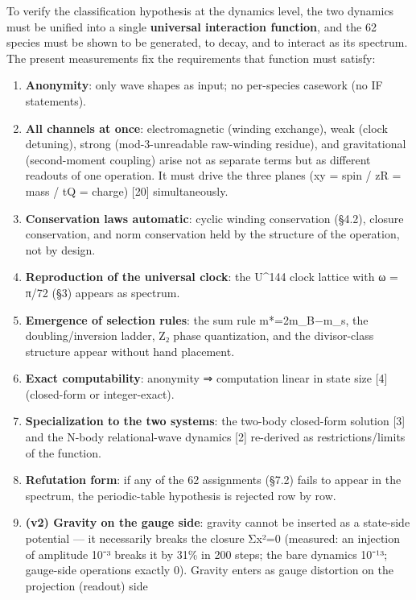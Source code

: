 \documentclass[
]{article}
\providecommand{\tightlist}{%
  \setlength{\itemsep}{0pt}\setlength{\parskip}{0pt}}
\begin{document}
To verify the classification hypothesis at the dynamics level, the two
dynamics must be unified into a single \textbf{universal interaction
function}, and the 62 species must be shown to be generated, to decay,
and to interact as its spectrum. The present measurements fix the
requirements that function must satisfy:

\begin{enumerate}
\def\labelenumi{\arabic{enumi}.}
\tightlist
\item
  \textbf{Anonymity}: only wave shapes as input; no per-species casework
  (no IF statements).
\item
  \textbf{All channels at once}: electromagnetic (winding exchange),
  weak (clock detuning), strong (mod-3-unreadable raw-winding residue),
  and gravitational (second-moment coupling) arise not as separate terms
  but as different readouts of one operation. It must drive the three
  planes (xy = spin / zR = mass / tQ = charge) {[}20{]} simultaneously.
\item
  \textbf{Conservation laws automatic}: cyclic winding conservation
  (§4.2), closure conservation, and norm conservation held by the
  structure of the operation, not by design.
\item
  \textbf{Reproduction of the universal clock}: the U\^{}144 clock
  lattice with ω = π/72 (§3) appears as spectrum.
\item
  \textbf{Emergence of selection rules}: the sum rule m*=2m\_B−m\_s, the
  doubling/inversion ladder, Z₂ phase quantization, and the
  divisor-class structure appear without hand placement.
\item
  \textbf{Exact computability}: anonymity ⇒ computation linear in state
  size {[}4{]} (closed-form or integer-exact).
\item
  \textbf{Specialization to the two systems}: the two-body closed-form
  solution {[}3{]} and the N-body relational-wave dynamics {[}2{]}
  re-derived as restrictions/limits of the function.
\item
  \textbf{Refutation form}: if any of the 62 assignments (§7.2) fails to
  appear in the spectrum, the periodic-table hypothesis is rejected row
  by row.
\item
  \textbf{(v2) Gravity on the gauge side}: gravity cannot be inserted as
  a state-side potential --- it necessarily breaks the closure Σx²=0
  (measured: an injection of amplitude 10⁻³ breaks it by 31\% in 200
  steps; the bare dynamics 10⁻¹³; gauge-side operations exactly 0).
  Gravity enters as gauge distortion on the projection (readout) side

\end{enumerate}
\end{document}
